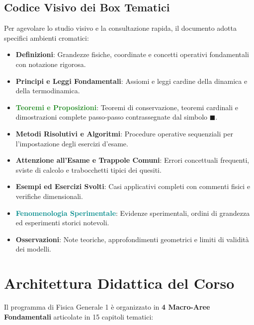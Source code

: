 \documentclass[11pt,a4paper,twoside,openright]{book}
\begin{document}
\section*{Codice Visivo dei Box Tematici}
Per agevolare lo studio visivo e la consultazione rapida, il documento adotta specifici ambienti cromatici:
\begin{itemize}
    \item \textbf{\textcolor{navyblue}{Definizioni}}: Grandezze fisiche, coordinate e concetti operativi fondamentali con notazione rigorosa.
    \item \textbf{\textcolor{purpleaccent}{Principi e Leggi Fondamentali}}: Assiomi e leggi cardine della dinamica e della termodinamica.
    \item \textbf{\textcolor{forestgreen}{Teoremi e Proposizioni}}: Teoremi di conservazione, teoremi cardinali e dimostrazioni complete passo-passo contrassegnate dal simbolo $\blacksquare$.
    \item \textbf{\textcolor{warmamber}{Metodi Risolutivi e Algoritmi}}: Procedure operative sequenziali per l'impostazione degli esercizi d'esame.
    \item \textbf{\textcolor{crimsonred}{Attenzione all'Esame e Trappole Comuni}}: Errori concettuali frequenti, sviste di calcolo e trabocchetti tipici dei quesiti.
    \item \textbf{\textcolor{purpleaccent}{Esempi ed Esercizi Svolti}}: Casi applicativi completi con commenti fisici e verifiche dimensionali.
    \item \textbf{\textcolor{darkcyan}{Fenomenologia Sperimentale}}: Evidenze sperimentali, ordini di grandezza ed esperimenti storici notevoli.
    \item \textbf{\textcolor{navyblue!80}{Osservazioni}}: Note teoriche, approfondimenti geometrici e limiti di validità dei modelli.
\end{itemize}

\cleardoublepage

\chapter*{Architettura Didattica del Corso}

Il programma di Fisica Generale 1 è organizzato in \textbf{4 Macro-Aree Fondamentali} articolate in 15 capitoli tematici:
\end{document}
